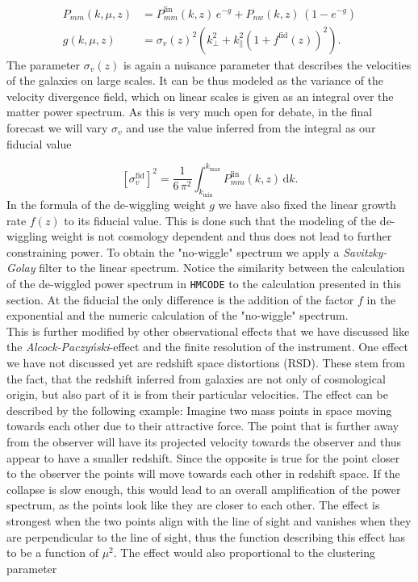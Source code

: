 \documentclass[oneside]{book}
\newcommand*{\rd}{\mathrm{d}}
\begin{document}
\begin{align}
    P_{mm}(k,\mu,z) &= P_{mm}^\mathrm{lin}(k,z)\,e^{-g} + P_{nw}(k,z)\,\left(1-e^{-g} \right)\\
    g(k,\mu,z) &= \sigma_v(z)^2 \left(k_\perp^2+k_\|^2\left(1+f^\mathrm{fid}(z)\right)^2 \right).
\end{align}
The parameter $\sigma_v(z)$ is again a nuisance parameter that describes the velocities of the galaxies on large scales. It can be thus modeled as the variance of the velocity divergence field, which on linear scales is given as an integral over the matter power spectrum. As this is very much open for debate, in the final forecast we will vary $\sigma_v$ and use the value inferred from the integral as our fiducial value  

\begin{equation}
    \left[\sigma_v^\mathrm{fid}\right]^2 = \frac{1}{6\,\pi^2} \int_{k_\mathrm{min}}^{k_\mathrm{max}} P^{\mathrm{lin}}_{mm}(k,z)\, \rd k.
\end{equation} 
In the formula of the de-wiggling weight $g$ we have also fixed the linear growth rate $f(z)$ to its fiducial value. This is done such that the modeling of the de-wiggling weight is not cosmology dependent and thus does not lead to further constraining power. To obtain the "no-wiggle" spectrum we apply a \textit{Savitzky-
Golay} filter to the linear spectrum. Notice the similarity between the calculation of the de-wiggled power spectrum in {\tt HMCODE} to the calculation presented in this section. At the fiducial the only difference is the addition of the factor $f$ in the exponential and the numeric calculation of the "no-wiggle" spectrum.\\ 
This is further modified by other observational effects that we have discussed like the \textit{Alcock-Paczyński}-effect and the finite resolution of the instrument. One effect we have not discussed yet are redshift space distortions (RSD). These stem from the fact, that the redshift inferred from galaxies are not only of cosmological origin, but also part of it is from their particular velocities. The effect can be described by the following example: Imagine two mass points in space moving towards each other due to their attractive force. The point that is further away from the observer will have its projected velocity towards the observer and thus appear to have a smaller redshift. Since the opposite is true for the point closer to the observer the points will move towards each other in redshift space. If the collapse is slow enough, this would lead to an overall amplification of the power spectrum, as the points look like they are closer to each other. The effect is strongest when the two points align with the line of sight and vanishes when they are perpendicular to the line of sight, thus the function describing this effect has to be a function of $\mu^2$. The effect would also proportional to the clustering parameter
\end{document}
